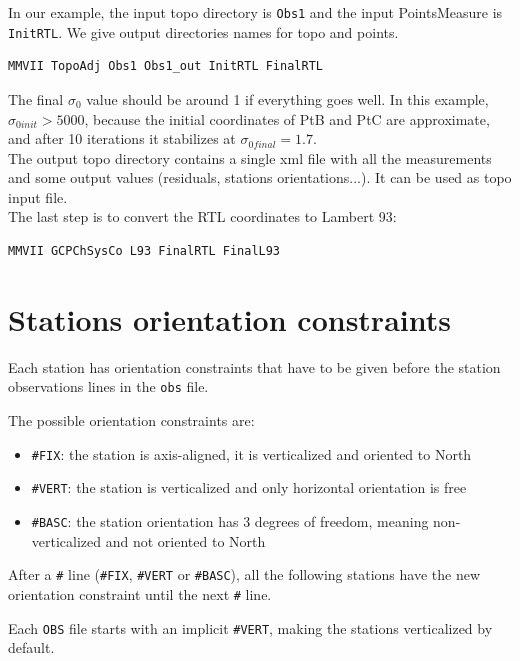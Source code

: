 In our example, the input topo directory is \texttt{Obs1} and the input PointsMeasure is \texttt{InitRTL}.
We give output directories names for topo and points.
\begin{lstlisting}
MMVII TopoAdj Obs1 Obs1_out InitRTL FinalRTL
\end{lstlisting}

The final $\sigma_0$ value should be around 1 if everything goes well.
In this example, $\sigma_{0 init} > 5000$, because the initial coordinates of PtB and PtC are approximate,
and after 10 iterations it stabilizes at $\sigma_{0 final} = 1.7$.
\\

The output topo directory contains a single xml file with all the measurements and some output values (residuals,
stations orientations...). It can be used as topo input file.
\\

The last step is to convert the RTL coordinates to Lambert 93:

\begin{lstlisting}
MMVII GCPChSysCo L93 FinalRTL FinalL93
\end{lstlisting}


\section{Stations orientation constraints}

Each station has orientation constraints that have to be given before the station observations lines in the \texttt{{obs}} file.

The possible orientation constraints are:
\begin{itemize}
   \item \texttt{\#FIX}: the station is axis-aligned, it is verticalized and oriented to North
   \item \texttt{\#VERT}: the station is verticalized and only horizontal orientation is free
   \item \texttt{\#BASC}: the station orientation has 3 degrees of freedom, meaning non-verticalized and not oriented to North
\end{itemize}

After a \texttt{\#} line (\texttt{\#FIX}, \texttt{\#VERT} or \texttt{\#BASC}), all the following stations have the new orientation constraint until the next \texttt{\#} line.

Each \texttt{OBS} file starts with an implicit \texttt{\#VERT}, making the stations verticalized by default.

